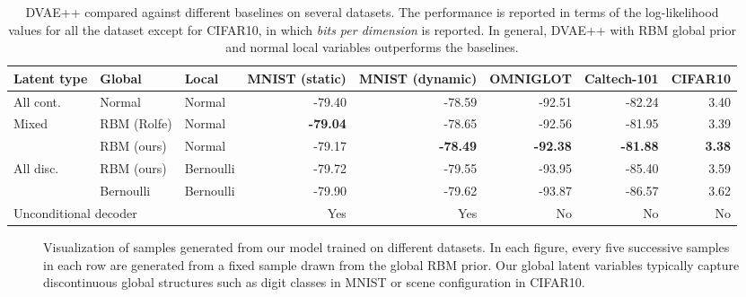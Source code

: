 \documentclass{article}
\begin{document}
\begin{table*}
\caption{DVAE++ compared against different baselines on several datasets. The performance is reported in terms of the log-likelihood values for all the dataset except for CIFAR10, in which \textit{bits per dimension} is reported. In general, DVAE++ with RBM global prior and normal local variables outperforms the baselines.} \label{tab:res_dvae}
\small
\centering
\begin{tabular}{l l l r r r r r}
Latent type & Global & Local  & MNIST (static) & MNIST (dynamic) & OMNIGLOT & Caltech-101 & CIFAR10 \\
\hline
All cont. & Normal & Normal & -79.40 & -78.59 & -92.51 & -82.24 & 3.40 \\
\hline
\multirow{2}{*}{Mixed} & RBM (Rolfe) & Normal    & \textbf{-79.04} & -78.65 & -92.56 & -81.95 & 3.39 \\
& RBM (ours)  & Normal    & -79.17 & \textbf{-78.49} & \textbf{-92.38} & \textbf{-81.88} & \textbf{3.38} \\
\hline
\multirow{2}{*}{All disc.} & RBM (ours)  & Bernoulli & -79.72 & -79.55 & -93.95 & -85.40 & 3.59 \\
& Bernoulli   & Bernoulli & -79.90 & -79.62 & -93.87 & -86.57 & 3.62 \\
\hline
\hline
\multicolumn{3}{l}{Unconditional decoder} & Yes & Yes & No & No & No \\
\end{tabular}
\end{table*}

\begin{figure*}
 \centering
    \hspace{0.1cm}
    \hspace{0.1cm}
    \hspace{0.1cm}
    \hspace{0.1cm}
  \caption{Visualization of samples generated from our model trained on different datasets. In each figure,
  every five successive samples in each row are generated from a fixed sample drawn from the global RBM prior. Our global latent variables typically capture discontinuous global structures such as digit
  classes in MNIST or scene configuration in CIFAR10.}
  \label{fig:vis}
\end{figure*}
\end{document}
